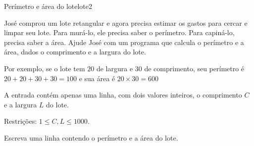 \documentclass[12pt,a4paper,oneside]{article}
\begin{document}
\begin{problem}{Perímetro e área do lote}{lote}{2}

\begingroup
\setlength{\intextsep}{0pt}%

José comprou um lote retangular e agora precisa estimar os gastos para cercar e limpar seu lote.
Para murá-lo, ele precisa saber o perímetro. Para capiná-lo, precisa saber a área.
Ajude José com um programa que calcula o perímetro e a área, dados o comprimento e a largura do lote.

Por exemplo, se o lote tem $20$ de largura e $30$ de comprimento, seu perímetro é $20+20+30+30 = 100$ e sua área é $20 \times 30 = 600$


\InputFile

A entrada contém apenas uma linha, com dois valores inteiros, o comprimento $C$ e a largura $L$ do lote.

Restrições: $1 \leq C, L \leq 1000$.

\endgroup

\OutputFile

Escreva uma linha contendo o perímetro e a área do lote.


\Example

\begin{example}
%
\end{example}

\begin{example}
%
\end{example}

\begin{example}
%
\end{example}


\end{problem}
\end{document}
